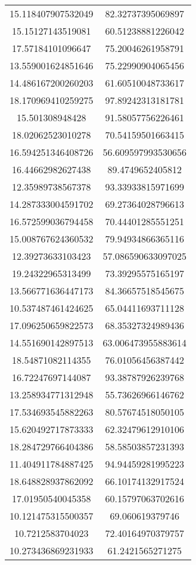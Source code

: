 \begin{table}
\begin{tabular}{cc}
15.118407907532049 & 82.32737395069897 \\
15.15127143519081 & 60.51238881226042 \\
17.57184101096647 & 75.20046261958791 \\
13.559001624851646 & 75.22990904065456 \\
14.486167200260203 & 61.60510048733617 \\
18.170969410259275 & 97.89242313181781 \\
15.501308948428 & 91.58057756226461 \\
18.02062523010278 & 70.54159501663415 \\
16.594251346408726 & 56.609597993530656 \\
16.44662982627438 & 89.4749652405812 \\
12.35989738567378 & 93.33933815971699 \\
14.287333004591702 & 69.27364028796613 \\
16.572599036794458 & 70.44401285551251 \\
15.008767624360532 & 79.94934866365116 \\
12.39273633103423 & 57.086590633097025 \\
19.24322965313499 & 73.39295575165197 \\
13.566771636447173 & 84.36657518545675 \\
10.537487461424625 & 65.04411693711128 \\
17.096250659822573 & 68.35327324989436 \\
14.551690142897513 & 63.006473955883614 \\
18.54871082114355 & 76.01056456387442 \\
16.72247697144087 & 93.38787926239768 \\
13.258934771312948 & 55.73626966146762 \\
17.534693545882263 & 80.57674518050105 \\
15.620492717873333 & 62.32479612910106 \\
18.284729766404386 & 58.58503857231393 \\
11.404911784887425 & 94.94459281995223 \\
18.648828937862092 & 66.10174132917524 \\
17.01950540045358 & 60.15797063702616 \\
10.121475315500357 & 69.060619379746 \\
10.7212583704023 & 72.40164970379757 \\
10.273436869231933 & 61.2421565271275 \\

\end{tabular}
\end{table}
